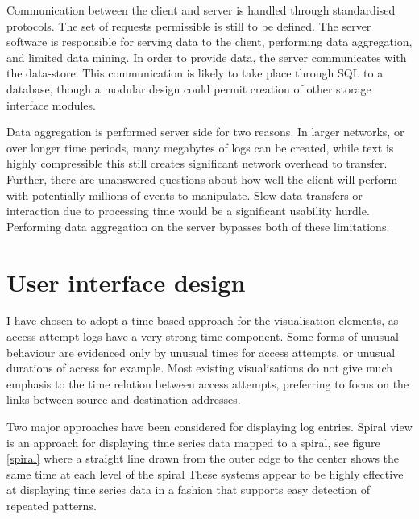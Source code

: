 Communication between the client and server is handled through standardised protocols. The set of requests permissible is still to be defined. The server software is responsible for serving data to the client, performing data aggregation, and limited data mining. In order to provide data, the server communicates with the data-store. This communication is likely to take place through SQL to a database, though a modular design could permit creation of other storage interface modules.

Data aggregation is performed server side for two reasons. In larger networks, or over longer time periods, many megabytes of logs can be created, while text is highly compressible this still creates significant network overhead to transfer. Further, there are unanswered questions about how well the client will perform with potentially millions of events to manipulate. Slow data transfers or interaction due to processing time would be a significant usability hurdle. Performing data aggregation on the server bypasses both of these limitations. 

\section{User interface design}\label{screen_design} 
  
I have chosen to adopt a time based approach for the visualisation elements, as access attempt logs have a very strong time component. Some forms of unusual behaviour are evidenced only by unusual times for access attempts, or unusual durations of access for example. Most existing visualisations do not give much emphasis to the time relation between access attempts, preferring to focus on the links between source and destination addresses.

Two major approaches have been considered for displaying log entries.
Spiral view is an approach for displaying time series data mapped to a spiral, see figure \ref{spiral} where a straight line drawn from the outer edge to the center shows the same time at each level of the spiral \cite{bertini2007spiralview, chin2009visual}
These systems appear to be highly effective at displaying time series data in a fashion that supports easy detection of repeated patterns. 

